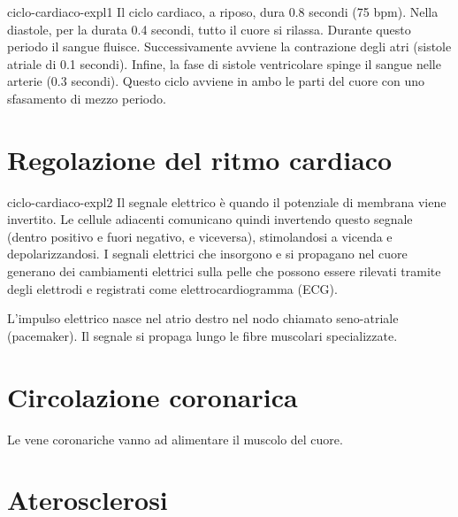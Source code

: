 \documentclass[preview]{standalone}
\begin{document}
\begin{snippet}{ciclo-cardiaco-expl1}
    Il ciclo cardiaco, a riposo, dura 0.8 secondi (75 bpm).
    Nella diastole, per la durata 0.4 secondi, tutto il cuore si rilassa.
    Durante questo periodo il sangue fluisce.
    Successivamente avviene la contrazione degli atri (sistole atriale di 0.1 secondi).
    Infine, la fase di sistole ventricolare spinge il sangue nelle arterie (0.3 secondi).
    Questo ciclo avviene in ambo le parti del cuore con uno sfasamento di mezzo periodo.
\end{snippet}

\section{Regolazione del ritmo cardiaco}

\begin{snippet}{ciclo-cardiaco-expl2}
    Il segnale elettrico è quando il potenziale di membrana viene invertito.
    Le cellule adiacenti comunicano quindi invertendo questo segnale (dentro positivo e fuori negativo, e viceversa),
    stimolandosi a vicenda e depolarizzandosi.
    I segnali elettrici che insorgono e si propagano nel cuore generano dei
    cambiamenti elettrici sulla pelle che possono essere rilevati tramite degli
    elettrodi e registrati come elettrocardiogramma (ECG).
    
    L'impulso elettrico nasce nel atrio destro nel nodo chiamato seno-atriale (pacemaker).
    Il segnale si propaga lungo le fibre muscolari specializzate.
    
\end{snippet}


\section{Circolazione coronarica}


\begin{plainhtml}
    Le vene coronariche vanno ad alimentare il muscolo del cuore.
\end{plainhtml}

\section{Aterosclerosi}
\end{document}
